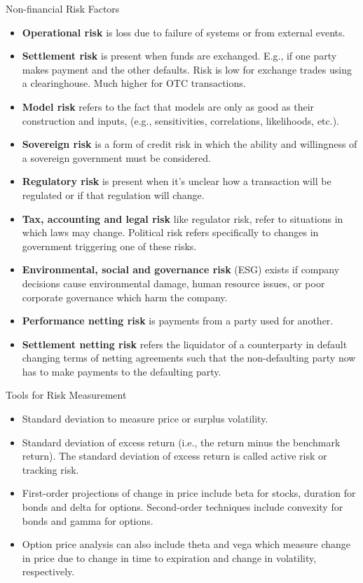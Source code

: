 \documentclass[../custom]{flashcards}
\newcommand{\studyArea}{Risk Management}
\begin{document}
\begin{flashcard}[\studyArea]{Non-financial Risk Factors}
    \vspace{-3mm}
    \begin{itemize}[itemsep=.2\itemsep]
        \item \textbf{Operational risk} is loss due to failure of systems or from external events.
        \item \textbf{Settlement risk} is present when funds are exchanged. E.g., if one party makes payment and the other defaults. Risk is low for exchange trades using a clearinghouse. Much higher for OTC transactions.
        \item \textbf{Model risk} refers to the fact that models are only as good as their construction and inputs, (e.g., sensitivities, correlations, likelihoods, etc.).
        \item \textbf{Sovereign risk} is a form of credit risk in which the ability and willingness of a sovereign government must be considered.
        \item \textbf{Regulatory risk} is present when it's unclear how a transaction will be regulated or if that regulation will change.
        \item \textbf{Tax, accounting and legal risk} like regulator risk, refer to situations in which laws may change. Political risk refers specifically to changes in government triggering one of these risks.
        \item \textbf{Environmental, social and governance risk} (ESG) exists if company decisions cause environmental damage, human resource issues, or poor corporate governance which harm the company.
        \item \textbf{Performance netting risk} is payments from a party used for another.
        \item \textbf{Settlement netting risk} refers the liquidator of a counterparty in default changing terms of netting agreements such that the non-defaulting party now has to make payments to the defaulting party.
    \end{itemize}
\end{flashcard}

\begin{flashcard}[\studyArea]{Tools for Risk Measurement}
    \begin{itemize}
        \item Standard deviation to measure price or surplus volatility.
        \item Standard deviation of excess return (i.e., the return minus the benchmark return). The standard deviation of excess return is called active risk or tracking risk.
        \item First-order projections of change in price include beta for stocks, duration for bonds and delta for options. Second-order techniques include convexity for bonds and gamma for options.
        \item Option price analysis can also include theta and vega which measure change in price due to change in time to expiration and change in volatility, respectively.
    \end{itemize}
\end{flashcard}
\end{document}
